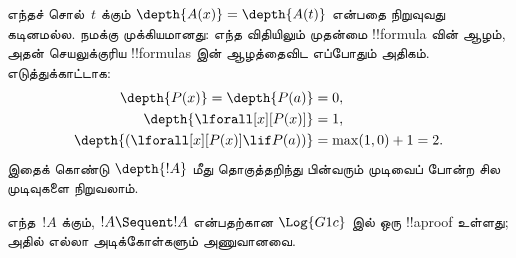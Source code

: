 \documentclass[../../../include/open-logic-section]{subfiles}
\begin{document}
எந்தச் சொல்~$t$ க்கும்
$\depth{A(x)} = \depth{A(t)}$
என்பதை நிறுவுவது கடினமல்ல.
நமக்கு முக்கியமானது: எந்த விதியிலும்
முதன்மை !!{formula} வின் ஆழம்,
அதன் செயலுக்குரிய !!{formula}s இன்
ஆழத்தைவிட எப்போதும் அதிகம்.
எடுத்துக்காட்டாக:
\begin{align*}
\depth{P(x)} = \depth{P(a)} & = 0,\\
\depth{\lforall[x][P(x)]} & = 1,\\
\depth{(\lforall[x][P(x)] \lif P(a))} & = \max(1,0) + 1 = 2.
\end{align*}
இதைக் கொண்டு $\depth{!A}$ மீது
தொகுத்தறிந்து பின்வரும் முடிவைப் போன்ற
சில முடிவுகளை நிறுவலாம்.

\begin{prop}
எந்த~$!A$ க்கும்,
$!A \Sequent !A$ என்பதற்கான
$\Log{G1c}$ இல் ஒரு !!a{proof} உள்ளது;
அதில் எல்லா அடிக்கோள்களும் அணுவானவை.
\end{prop}
\end{document}
